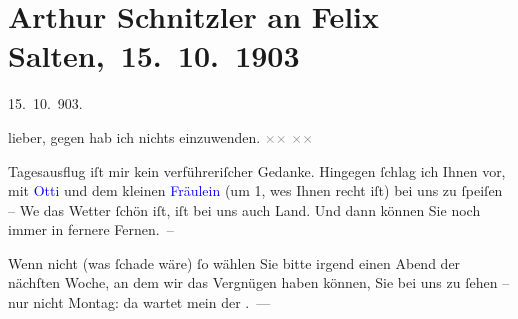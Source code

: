 

\renewcommand{\erwaehntePersonen}{Personen: Caroline Kotter, Felix Salten, Ottilie Salten}
\renewcommand{\erwaehnteInstitutionen}{Institutionen: Neue akademische Vereinigung}
\renewcommand{\erwaehnteOrte}{Orte: Brünn, Deutsches Haus, Wien}
\renewcommand{\erwaehnteWerke}{}
\section[ Arthur Schnitzler an Felix Salten, 15. 10. 1903]{Arthur Schnitzler an Felix Salten, 15. 10. 1903}
\nopagebreak{}
\rehead{ }\normalsize\beginnumbering{}
\toendnotes[C]{\smallbreak\pagebreak[2]}
\toendnotes[C]{\smallbreak}
\pstart
           \raggedleft{}{\pb}15. 10. 903.\pend
           
\pstart
           lieber, gegen \label{K_L02985-1v}\label{K_L02985-1h} hab ich nichts einzuwenden. \textcolor{gray}{×}\-\textcolor{gray}{×}{ }\textcolor{gray}{×}\-\textcolor{gray}{×}\pend
           
\pstart
           Tagesausflug iſt mir kein verführeriſcher Gedanke. Hingegen ſchlag ich Ihnen vor, mit
                  \textcolor{blue}{Otti}{}\ledrightnote{\textcolor{blue}{Ottilie Salten}} und dem kleinen \textcolor{blue}{Fräulein}{}\ledrightnote{{$\rightarrow$}\textcolor{blue}{Caroline Kotter}}{ }\label{K_L02985-2v}\label{K_L02985-2h} (um 1, we{\geminationn}s {\pb}Ihnen recht iſt) bei uns zu ſpeiſen – We{\geminationn} das Wetter ſchön iſt, iſt bei uns auch Land. Und dann
               können Sie noch immer in fernere Fernen. –\pend
           
\pstart
           Wenn nicht (was ſchade wäre) ſo wählen Sie bitte irgend einen Abend der {\pb}nächſten Woche, an dem wir das Vergnügen
               haben können, Sie bei uns zu ſehen – nur nicht Montag:
               da wartet mein der \label{K_L02985-3v}\label{K_L02985-3h}. —\pend
           
